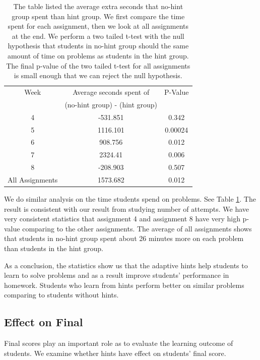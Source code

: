 \documentclass{llncs}
\begin{document}
\begin{table}
\caption{The table listed the average extra seconds that no-hint group spent than hint group. We first compare the time spent for each assignment, then we look at all assignments at the end. We perform a two tailed t-test with the null hypothesis that students in no-hint group should the same amount of time on problems as students in the hint group. The final p-value of the two tailed t-test for all assignments is small enough that we can reject the null hypothesis.}
\begin{center}
  \begin{tabular}{| c | c | c |}
  \hline
   Week & Average seconds spent of & P-Value \\
      & (no-hint group) - (hint group)  & \\ \hline
	4 & -531.851 & 0.342 \\
	5 & 1116.101 & 0.00024 \\
	6 & 908.756 & 0.012 \\
	7 & 2324.41 & 0.006 \\
	8 & -208.903 & 0.507 \\ \hline
    All Assignments & 1573.682 & 0.012 \\ 
    \hline
  \end{tabular}
  \label{tab:no_hint_time}
  \end{center}
\end{table}

We do similar analysis on the time students spend on problems. See Table \ref{tab:no_hint_time}. The result is consistent with our result from studying number of attempts. We have very consistent statistics that assignment 4 and assignment 8 have very high p-value comparing to the other assignments. The average of all assignments shows that students in no-hint group spent about 26 minutes more on each problem than students in the hint group.

As a conclusion, the statistics show us that the adaptive hints help students to learn to solve problems and as a result improve students' performance in homework. Students who learn from hints perform better on similar problems comparing to students without hints.

\subsection{Effect on Final}
Final scores play an important role as to evaluate the learning outcome of students. We examine whether hints have effect on students' final score.
\end{document}
